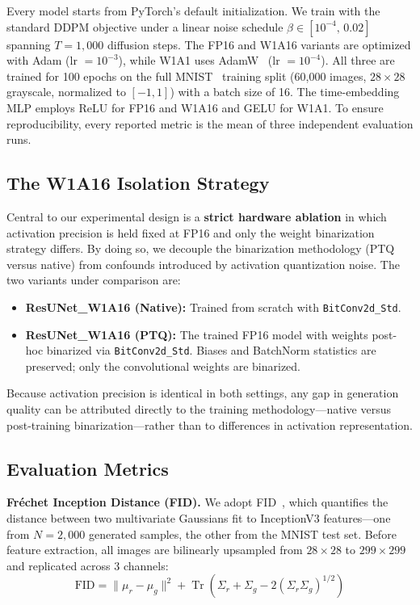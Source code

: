 \documentclass[conference]{IEEEtran}
\begin{document}
Every model starts from PyTorch's default initialization. We train with the standard
DDPM objective under a linear noise schedule $\beta \in [10^{-4},\,0.02]$ spanning
$T=1{,}000$ diffusion steps. The FP16 and W1A16 variants are optimized with
Adam (lr $=10^{-3}$), while W1A1 uses
AdamW~\cite{loshchilov2019adamw} (lr $=10^{-4}$). All three are trained for 100 epochs
on the full MNIST~\cite{lecun1998mnist} training split (60{,}000 images, $28{\times}28$ grayscale, normalized
to $[-1,1]$) with a batch size of 16. The time-embedding MLP employs ReLU for FP16 and
W1A16 and GELU for W1A1. To ensure reproducibility, every reported metric is the mean
of three independent evaluation runs.

\subsection{The W1A16 Isolation Strategy}

Central to our experimental design is a \textbf{strict hardware ablation} in which
activation precision is held fixed at FP16 and only the weight binarization strategy
differs. By doing so, we decouple the binarization methodology (PTQ versus native) from
confounds introduced by activation quantization noise. The two variants under comparison
are:

\begin{itemize}
  \item \textbf{ResUNet\_W1A16 (Native):} Trained from scratch with
    \texttt{BitConv2d\_Std}.
  \item \textbf{ResUNet\_W1A16 (PTQ):} The trained FP16 model with weights post-hoc
    binarized via \texttt{BitConv2d\_Std}. Biases and BatchNorm statistics are
    preserved; only the convolutional weights are binarized.
\end{itemize}

Because activation precision is identical in both settings, any gap in generation quality
can be attributed directly to the training methodology---native versus post-training
binarization---rather than to differences in activation representation.

\subsection{Evaluation Metrics}

\textbf{Fr\'echet Inception Distance (FID).} We adopt FID~\cite{heusel2017fid}, which
quantifies the distance between two multivariate Gaussians fit to InceptionV3 features---one
from $N=2{,}000$ generated samples, the other from the MNIST test set. Before feature
extraction, all images are bilinearly upsampled from $28{\times}28$ to $299{\times}299$
and replicated across 3 channels:
\begin{equation}
  \text{FID} = \|\mu_r - \mu_g\|^2 +
  \operatorname{Tr}\!\left(\Sigma_r + \Sigma_g -
  2(\Sigma_r\Sigma_g)^{1/2}\right)
  \label{eq:fid}
\end{equation}
\end{document}
